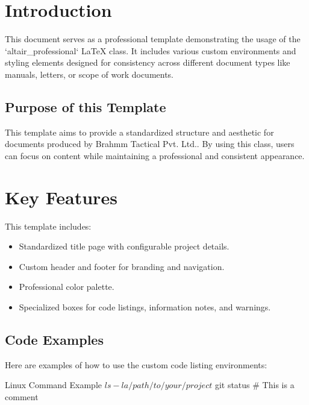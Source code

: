 \documentclass{altair_professional}
\renewcommand{\companyName}{Brahmm Tactical Pvt. Ltd.}
\begin{document}
\maketitle

\clearpage


\section{Introduction}
This document serves as a professional template demonstrating the usage of the `altair\_professional` LaTeX class. It includes various custom environments and styling elements designed for consistency across different document types like manuals, letters, or scope of work documents.

\subsection{Purpose of this Template}
This template aims to provide a standardized structure and aesthetic for documents produced by \companyName. By using this class, users can focus on content while maintaining a professional and consistent appearance.

\section{Key Features}
This template includes:
\begin{itemize}
  \item Standardized title page with configurable project details.
  \item Custom header and footer for branding and navigation.
  \item Professional color palette.
  \item Specialized boxes for code listings, information notes, and warnings.
\end{itemize}

\subsection{Code Examples}
Here are examples of how to use the custom code listing environments:

\begin{terminal}{Linux Command Example}
  $ ls -la /path/to/your/project
  $ git status
  # This is a comment
\end{terminal}
\end{document}
